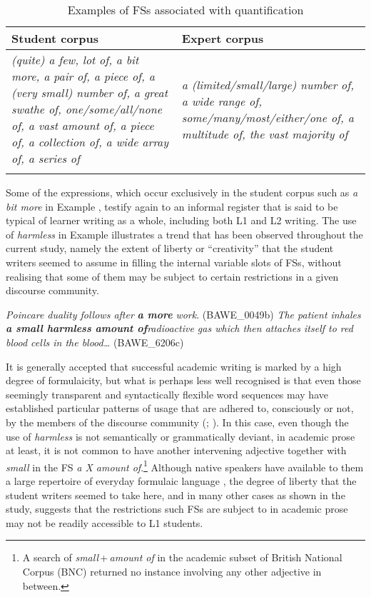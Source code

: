 \documentclass[output=paper]{langscibook}
\begin{document}
\begin{table}
\begin{tabularx}{\textwidth}{QQ}
\lsptoprule
Student corpus & Expert corpus\\\midrule
\textit{(quite) a few, lot of, a bit more, a pair of, a piece of, a (very small) number of, a great swathe of, one/some/all/none of, a vast amount of, a piece of, a collection of, a wide array of, a series of} & \textit{a (limited/small/large) number of, a wide range of, some/many/most/either/one of, a multitude of, the vast majority of}\\
\lspbottomrule
\end{tabularx}
\caption{Examples of FSs associated with quantification\label{tab:wang:10}}
\end{table}

Some of the expressions, which occur exclusively in the student corpus such as \textit{a bit more} in Example , testify again to an informal register that is said to be typical of learner writing as a whole, including both L1 and L2 writing. The use of \textit{harmless} in Example  illustrates a trend that has been observed throughout the current study, namely the extent of liberty or ``creativity'' that the student writers seemed to assume in filling the internal variable slots of FSs, without realising that some of them may be subject to certain restrictions in a given discourse community. 

\ea \label{ex:wang:8}\textit{Poincare duality follows after} \textbf{\textit{a more}} \textit{work}. (BAWE\_0049b)
\ex \label{ex:wang:9}\textit{The patient inhales} \textbf{\textit{a small harmless amount of}}\textit{radioactive gas which then attaches itself to red blood cells in the blood…} (BAWE\_6206c)
\z

It is generally accepted that successful academic writing is marked by a high degree of formulaicity, but what is perhaps less well recognised is that even those seemingly transparent and syntactically flexible word sequences may have established particular patterns of usage that are adhered to, consciously or not, by the members of the discourse community (\citealt{Pérez-Llantada2014}; \citealt{Wang2018}). In this case, even though the use of \textit{harmless} is not semantically or grammatically deviant, in academic prose at least, it is not common to have another intervening adjective together with \textit{small} in the FS \textit{a X amount of}.\footnote{A search of \textit{small}\,+\,\textit{amount of} in the academic subset of British National Corpus (BNC) returned no instance involving any other adjective in between.} Although native speakers have available to them a large repertoire of everyday formulaic language \citep{Sinclair1991}, the degree of liberty that the student writers seemed to take here, and in many other cases as shown in the study, suggests that the restrictions such FSs are subject to in academic prose may not be readily accessible to L1 students.
\end{document}
